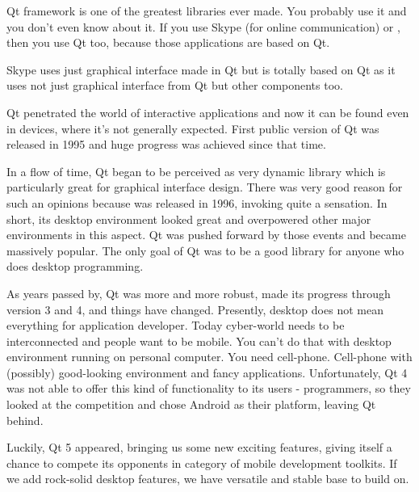 Qt framework is one of the greatest libraries ever made. You probably use it and you don't even know about it. If you use Skype (for online communication) or , then you use Qt too, because those applications are based on Qt.

Skype uses just graphical interface made in Qt but  is totally based on Qt as it uses not just graphical interface from Qt but other components too.

Qt penetrated the world of interactive applications and now it can be found even in devices, where it's not generally expected. First public version of Qt was released in 1995 and huge progress was achieved since that time.

In a flow of time, Qt began to be perceived as very dynamic library which is particularly great for graphical interface design. There was very good reason for such an opinions because  was released in 1996, invoking quite a sensation. In short, its desktop environment looked great and overpowered other major environments in this aspect. Qt was pushed forward by those events and became massively popular. The only goal of Qt was to be a good library for anyone who does desktop programming.

As years passed by, Qt was more and more robust,  made its progress through version 3 and 4, and things have changed. Presently, desktop does not mean everything for application developer. Today cyber-world needs to be interconnected and people want to be mobile. You can't do that with desktop environment running on personal computer. You need cell-phone. Cell-phone with (possibly) good-looking environment and fancy applications. Unfortunately, Qt 4 was not able to offer this kind of functionality to its users - programmers, so they looked at the competition and chose Android as their platform, leaving Qt behind.

Luckily, Qt 5 appeared, bringing us some new exciting features, giving itself a chance to compete its opponents in category of mobile development toolkits. If we add rock-solid desktop features, we have versatile and stable base to build on.

